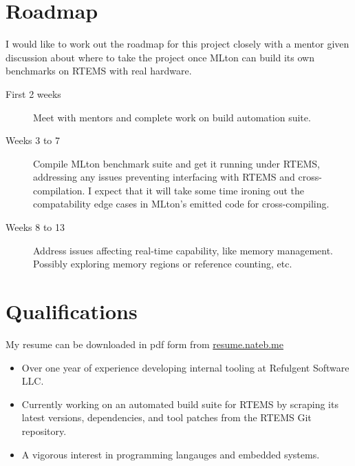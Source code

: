 \documentclass[12pt]{article}
\begin{document}
\section{Roadmap}
I would like to work out the roadmap for this project closely with a mentor given discussion about where to take the project once MLton can build its own benchmarks on RTEMS with real hardware.
\begin{description}
\item[First 2 weeks] Meet with mentors and complete work on build automation suite.
\item[Weeks 3 to 7] Compile MLton benchmark suite and get it running under RTEMS, addressing any issues preventing interfacing with RTEMS and cross-compilation. I expect that it will take some time ironing out the compatability edge cases in MLton's emitted code for cross-compiling.
\item[Weeks 8 to 13] Address issues affecting real-time capability, like memory management. Possibly exploring memory regions or reference counting, etc.
\end{description}

\section{Qualifications}
My resume can be downloaded in pdf form from \url{resume.nateb.me}
\begin{itemize}
\item Over one year of experience developing internal tooling at Refulgent Software LLC.
\item Currently working on an automated build suite for RTEMS by scraping its latest versions, dependencies, and tool patches from the RTEMS Git repository.
\item A vigorous interest in programming langauges and embedded systems.

\end{itemize}
\end{document}
